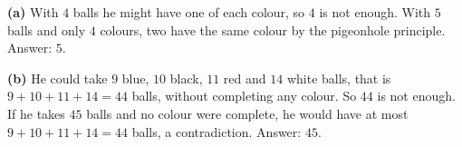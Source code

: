 \textbf{(a)} With $4$ balls he might have one of each colour, so $4$ is not enough. With $5$ balls and only $4$ colours, two have the same colour by the pigeonhole principle. Answer: $\boxed{5}$.

\textbf{(b)} He could take $9$ blue, $10$ black, $11$ red and $14$ white balls, that is $9+10+11+14=44$ balls, without completing any colour. So $44$ is not enough. If he takes $45$ balls and no colour were complete, he would have at most $9+10+11+14=44$ balls, a contradiction. Answer: $\boxed{45}$.
